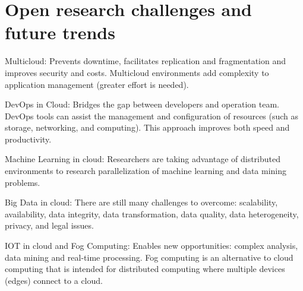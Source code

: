 \documentclass[14pt,oneside]{extreport}
\newcommand*\fpar{\hspace{1ex}}
\begin{document}
\section{Open research challenges and future trends}
\fpar Multicloud: Prevents downtime, facilitates replication and fragmentation and improves security and costs. Multicloud environments add complexity to application management (greater effort is needed).
\par DevOps in Cloud: Bridges the gap between developers and operation team. DevOps tools can assist the management and configuration of resources (such as storage, networking, and computing). This approach improves both speed and productivity.
\par Machine Learning in cloud: Researchers are taking advantage of distributed environments to research parallelization of machine learning and data mining problems.
\par Big Data in cloud: There are still many challenges to overcome: scalability, availability, data integrity, data transformation, data quality, data heterogeneity, privacy, and legal issues.
\par IOT in cloud and Fog Computing: Enables new opportunities: complex analysis, data mining and real-time processing. Fog computing is an alternative to cloud computing that is intended for distributed computing where multiple devices (edges) connect to a cloud. 



\end{document}
